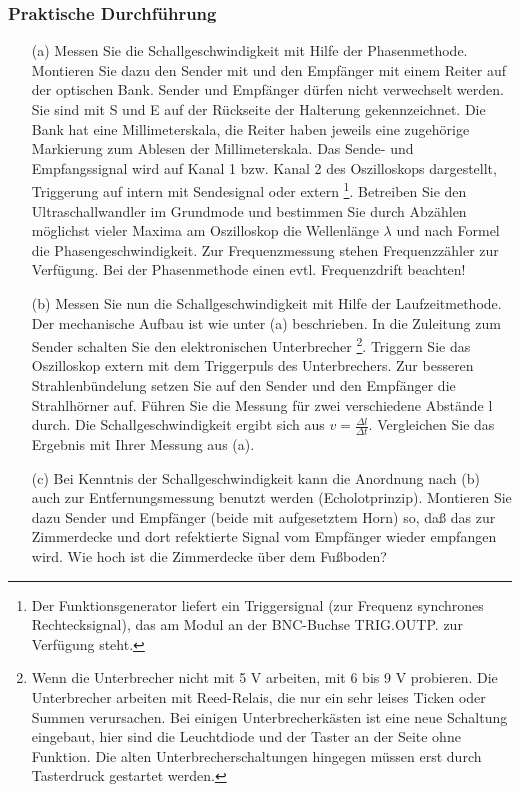 \documentclass[12pt]{scrartcl}
\begin{document}
\subsubsection{Praktische Durchführung}
\begin{itemize}
\item[(a)]
Messen Sie die Schallgeschwindigkeit mit Hilfe der Phasenmethode. Montieren Sie dazu den Sender mit und den Empfänger mit einem Reiter auf der optischen Bank. Sender und Empfänger dürfen nicht verwechselt werden. Sie sind mit S und E auf der Rückseite der Halterung gekennzeichnet. Die Bank hat eine Millimeterskala, die Reiter haben
jeweils eine zugehörige Markierung zum Ablesen der Millimeterskala. Das Sende- und Empfangssignal wird auf Kanal 1 bzw. Kanal 2 des Oszilloskops dargestellt, Triggerung auf intern mit Sendesignal oder extern
\footnote{Der Funktionsgenerator liefert ein Triggersignal (zur Frequenz synchrones Rechtecksignal), das am Modul an der BNC-Buchse TRIG.OUTP. zur Verfügung steht.}. Betreiben Sie den Ultraschallwandler im Grundmode und bestimmen Sie durch Abzählen möglichst vieler Maxima am Oszilloskop die Wellenlänge $\lambda$
und nach Formel
die Phasengeschwindigkeit.
Zur Frequenzmessung stehen Frequenzzähler zur Verfügung. Bei der Phasenmethode einen evtl. Frequenzdrift beachten!
\item[(b)]
Messen Sie nun die Schallgeschwindigkeit mit Hilfe der Laufzeitmethode. Der mechanische Aufbau ist wie unter (a) beschrieben. In die Zuleitung zum Sender schalten Sie den elektronischen Unterbrecher \footnote{Wenn die Unterbrecher nicht mit 5 V arbeiten, mit 6 bis 9 V probieren. Die Unterbrecher arbeiten mit Reed-Relais, die nur ein sehr leises Ticken oder Summen verursachen. Bei einigen Unterbrecherkästen ist eine neue Schaltung eingebaut, hier sind die Leuchtdiode und der Taster an der Seite ohne Funktion. Die alten Unterbrecherschaltungen hingegen müssen erst durch Tasterdruck gestartet werden.}. Triggern Sie das Oszilloskop extern mit dem Triggerpuls des Unterbrechers. Zur besseren Strahlenbündelung setzen Sie auf den Sender und den Empfänger die Strahlhörner auf. Führen Sie die Messung für zwei verschiedene Abstände
l durch. Die Schallgeschwindigkeit ergibt sich aus $v = \frac{\Delta l}{\Delta t}$. Vergleichen Sie das Ergebnis mit Ihrer Messung aus (a).
\item[(c)]
Bei Kenntnis der Schallgeschwindigkeit kann die Anordnung nach (b) auch zur Entfernungsmessung benutzt werden (Echolotprinzip). Montieren Sie dazu Sender und Empfänger (beide mit aufgesetztem Horn) so, daß das zur Zimmerdecke und dort refektierte Signal vom Empfänger wieder empfangen wird. Wie hoch ist die Zimmerdecke über dem Fußboden?
\end{itemize}
\end{document}
